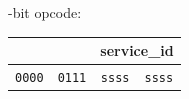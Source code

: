 \documentclass{scrreprt}
\begin{document}
-bit opcode:

\noindent
\begin{tabular}{|c|c|c|c|}
 \multicolumn{2}{|c|}{} &\multicolumn{2}{c|}{service_id} \\
\hline
\texttt{0000} & \texttt{0111} & \texttt{ssss} & \texttt{ssss}\\

\end{tabular}
\vspace{0.1in}

\end{document}
